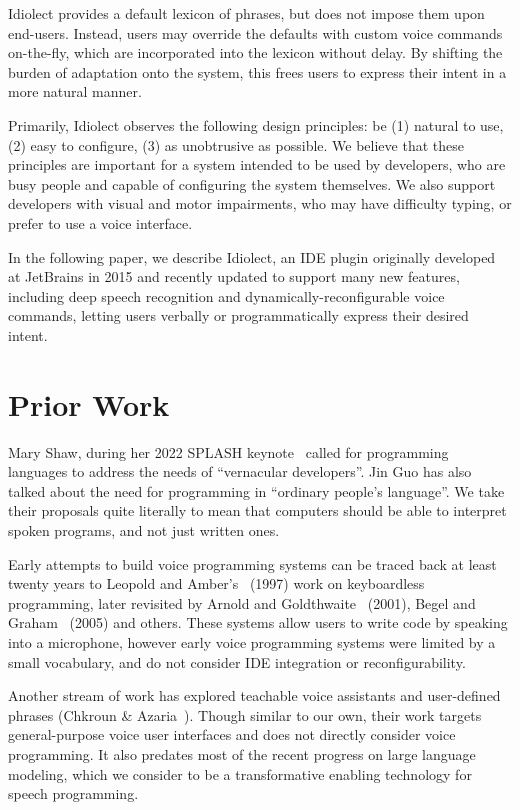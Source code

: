 \documentclass[conference]{IEEEtran}
\begin{document}
Idiolect provides a default lexicon of phrases, but does not impose them upon end-users. Instead, users may override the defaults with custom voice commands on-the-fly, which are incorporated into the lexicon without delay. By shifting the burden of adaptation onto the system, this frees users to express their intent in a more natural manner.

Primarily, Idiolect observes the following design principles: be (1) natural to use, (2) easy to configure, (3) as unobtrusive as possible. We believe that these principles are important for a system intended to be used by developers, who are busy people and capable of configuring the system themselves. We also support developers with visual and motor impairments, who may have difficulty typing, or prefer to use a voice interface.

In the following paper, we describe Idiolect, an IDE plugin originally developed at JetBrains in 2015 and recently updated to support many new features, including deep speech recognition and dynamically-reconfigurable voice commands, letting users verbally or programmatically express their desired intent.

\section{Prior Work}

Mary Shaw, during her 2022 SPLASH keynote~\cite{shaw2022myths} called for programming languages to address the needs of ``vernacular developers''. Jin Guo has also talked about the need for programming in ``ordinary people's language''. We take their proposals quite literally to mean that computers should be able to interpret spoken programs, and not just written ones.

Early attempts to build voice programming systems can be traced back at least twenty years to Leopold and Amber's~\cite{leopold1997keyboardless} (1997) work on keyboardless programming, later revisited by Arnold and Goldthwaite~\cite{arnold2000programming} (2001), Begel and Graham~\cite{begel2005spoken} (2005) and others. These systems allow users to write code by speaking into a microphone, however early voice programming systems were limited by a small vocabulary, and do not consider IDE integration or reconfigurability.

Another stream of work has explored teachable voice assistants and user-defined phrases (Chkroun \& Azaria~\cite{chkroun2019lia}). Though similar to our own, their work targets general-purpose voice user interfaces and does not directly consider voice programming. It also predates most of the recent progress on large language modeling, which we consider to be a transformative enabling technology for speech programming.
\end{document}
